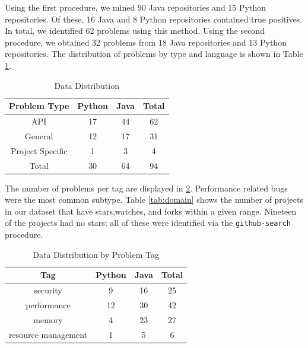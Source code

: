 \documentclass[sigconf]{acmart}
\begin{document}
Using the first procedure, we mined 90 Java repositories and 15 Python repositories. Of these, 16 Java and 8 Python repositories contained true positives. In total, we identified 62  problems using this method. Using the second procedure, we obtained 32 problems from 18 Java repositories and 13 Python repositories. The distribution of problems by type and language is shown in Table \ref{tab:type}.

\begin{table}
  \caption{Data Distribution}
  \label{tab:type}
\begin{tabular}{ c c c c }
  \toprule
  Problem Type & Python & Java & Total\\
  \midrule
  API        		&	17  &  44 &  62\\
  General    		&	12  &  17 &  31\\
  Project Specific  &	1  &   3 &    4\\
  \midrule
  Total      		&	30  &  64 &  94\\
  \bottomrule
\end{tabular}
\end{table}

The number of problems per tag are displayed in \ref{tab:tag}. Performance related bugs were the most common subtype. Table \ref{tab:domain} shows the number of projects in our dataset that have stars,watches, and forks within a given range. Nineteen of the projects had no stars; all of these were identified via the \texttt{github-search} procedure.

\begin{table}
  \caption{Data Distribution by Problem Tag}
  \label{tab:tag}
\begin{tabular}{  c c c c }
  \toprule
  Tag  				&Python &Java & Total\\
  \midrule
  security				& 9 &16 &25 \\
  performance			&12 &30 &42 \\
  memory				& 4 &23 &27 \\
  resource management	& 1 & 5&  6 \\
  \bottomrule
\end{tabular}
\end{table}
\end{document}

